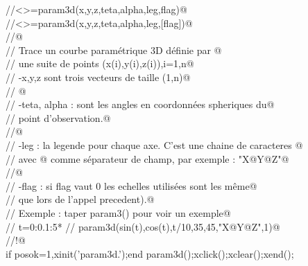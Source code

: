 
\verb@//<>=param3d(x,y,z,teta,alpha,leg,flag)@ \\
\verb@//<>=param3d(x,y,z,teta,alpha,leg,[flag])@ \\
\verb@//@ \\
\verb@// Trace un courbe param\'etrique 3D d\'efinie par @ \\
\verb@// une suite de points (x(i),y(i),z(i)),i=1,n@ \\
\verb@// -x,y,z sont trois vecteurs de taille (1,n)@ \\
\verb@// @ \\
\verb@// -teta, alpha : sont les angles en coordonn\'ees spheriques du@ \\
\verb@// point d'observation.@ \\
\verb@//@ \\
\verb@// -leg : la legende pour chaque axe. C'est une chaine de caracteres @ \\
\verb@//      avec @ comme s\'eparateur de champ, par exemple : "X@Y@Z"@ \\
\verb@//@ \\
\verb@// -flag : si flag vaut 0 les echelles utilis\'ees sont les m\^eme@ \\
\verb@//       que lors de  l'appel precedent).@ \\
\verb@// Exemple : taper param3() pour voir un exemple@ \\
\verb@// t=0:0.1:5*%pi;@ \\
\verb@// param3d(sin(t),cos(t),t/10,35,45,"X@Y@Z",1)@ \\
\verb@//!@ \\
if posok=1,xinit('param3d.');end
param3d();xclick();xclear();xend();



